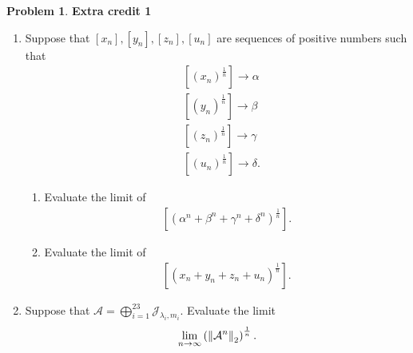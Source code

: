 \documentclass{article}
\theoremstyle{definition}
\newtheorem*{prob*}{Problem}
\newcommand{\A}{\mathcal{A}}
\newcommand{\jor}{\mathcal{J}}
\begin{document}
\newpage




\begin{prob*}\textbf{Extra credit 1}\\
	\begin{enumerate}
		\item Suppose that $[x_n],[y_n],[z_n],[u_n]$ are sequences of positive numbers such that
		\begin{align*}
		& \left[ (x_n)^{\frac{1}{n}} \right] \longrightarrow \alpha\\
		& \left[ (y_n)^{\frac{1}{n}} \right] \longrightarrow \beta\\
		& \left[ (z_n)^{\frac{1}{n}} \right] \longrightarrow \gamma\\
		& \left[ (u_n)^{\frac{1}{n}} \right] \longrightarrow \delta.
		\end{align*}
		
		
		\begin{enumerate}
			\item Evaluate the limit of 
			\begin{align*}
			\left[ (\alpha^n + \beta^n + \gamma^n + \delta^n)^{\frac{1}{n}} \right].
			\end{align*} 
			
			
			\item Evaluate the limit of 
			\begin{align*}
			\left[ (x_n + y_n + z_n + u_n)^{\frac{1}{n}} \right].
			\end{align*}
		\end{enumerate}
	
	
	\item Suppose that $\A = \bigoplus^{23}_{i=1} \jor_{\lambda_i, m_i}$. Evaluate the limit
	\begin{align*}
	\lim\limits_{n\to\infty}\left( \norm{\A^n}_2 \right)^{\frac{1}{n}}.
	\end{align*}
	\end{enumerate}
	
	
	

\end{prob*}
\end{document}
